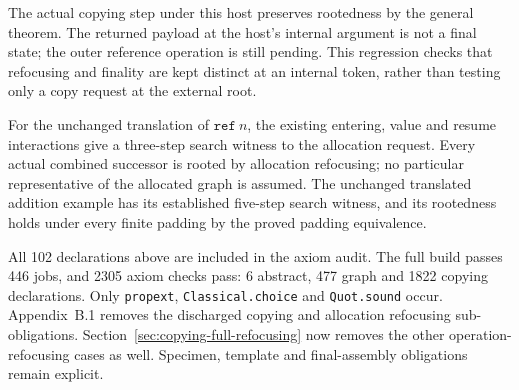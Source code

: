 




The actual copying step under this host preserves rootedness by the general
theorem. The returned payload at the host's internal argument is not a final
state; the outer reference operation is still pending. This regression checks
that refocusing and finality are kept distinct at an internal token, rather
than testing only a copy request at the external root.



For the unchanged translation of $\mathtt{ref}\ n$, the existing entering,
value and resume interactions give a three-step search witness to the
allocation request. Every actual combined successor is rooted by allocation
refocusing; no particular representative of the allocated graph is assumed.
The unchanged translated addition example has its established five-step
search witness, and its rootedness holds under every finite padding by the
proved padding equivalence.





All 102 declarations above are included in the axiom audit. The full build
passes 446 jobs, and 2305 axiom checks pass: 6 abstract, 477 graph and 1822
copying declarations. Only \texttt{propext}, \texttt{Classical.choice} and
\texttt{Quot.sound} occur. Appendix~B.1 removes the discharged copying and
allocation refocusing sub-obligations. Section~\ref{sec:copying-full-refocusing}
now removes the other operation-refocusing cases as well. Specimen, template
and final-assembly obligations remain explicit.
